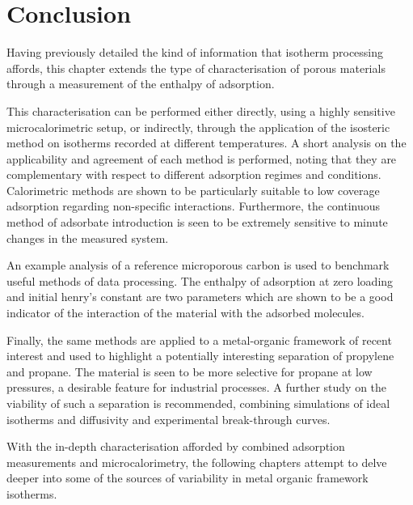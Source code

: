 
\section{Conclusion}

Having previously detailed the kind of information that isotherm
processing affords, this chapter extends the type of characterisation
of porous materials through a measurement of the enthalpy of 
adsorption.

This characterisation can be performed either 
directly, using a highly sensitive microcalorimetric setup, or 
indirectly, through the application of the isosteric method on
isotherms recorded at different temperatures. A short analysis
on the applicability and agreement of each method is performed,
noting that they are complementary with respect to different
adsorption regimes and conditions. Calorimetric methods
are shown to be particularly suitable to low coverage adsorption 
regarding non-specific interactions. Furthermore, the continuous method
of adsorbate introduction is seen to be extremely sensitive
to minute changes in the measured system.

An example analysis of a reference microporous carbon is
used to benchmark useful methods of data processing. The 
enthalpy of adsorption at zero loading and initial henry's 
constant are two parameters which are shown to be a good 
indicator of the interaction of the material with the 
adsorbed molecules.

Finally, the same methods are applied to a metal-organic
framework of recent interest and used to highlight 
a potentially interesting separation of propylene and 
propane. The material is seen to be more selective for 
propane at low pressures, a desirable feature for 
industrial processes. A further study on the viability 
of such a separation is recommended, combining simulations of 
ideal isotherms and diffusivity and experimental break-through
curves.

With the in-depth characterisation afforded by combined adsorption
measurements and microcalorimetry, the following chapters attempt
to delve deeper into some of the sources of variability in metal
organic framework isotherms.

\FloatBarrier{}
\pagebreak